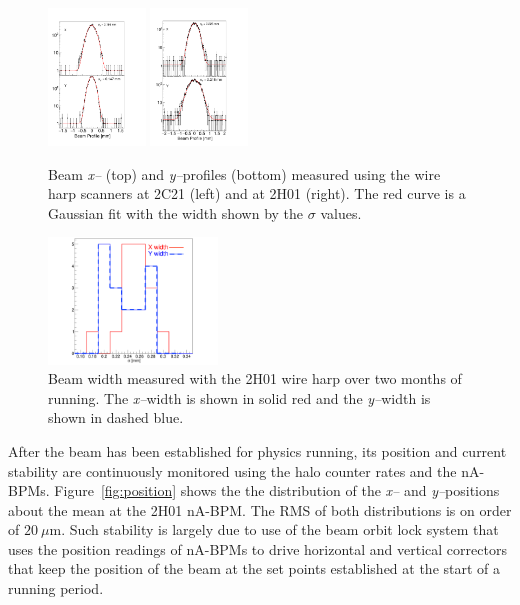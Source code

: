 \begin{figure}[ht]
\begin{center}
\includegraphics[width=0.23\textwidth]{2C21_fits.pdf}
\includegraphics[width=0.23\textwidth]{2H01_fits.pdf}
	\caption{Beam {\it x--} (top) and {\it y--}profiles (bottom) measured using the wire harp scanners at 2C21 (left) and at 2H01 (right). The red
	curve is a Gaussian fit with the width shown by the $\sigma$ values. }
\label{fig:profile}
\end{center}
\end{figure}

\begin{figure}[ht]
\begin{center}
\includegraphics[width=0.4\textwidth]{BeamWidth.pdf}
	\caption{Beam width measured with the 2H01 wire harp over two months of running. The {\it x--}width is shown in solid red and the 
	{\it y--}width is shown in dashed blue.}
\label{fig:prof2h01}
\end{center}
\end{figure}

After the beam has been established for physics running, its position and current stability are continuously monitored using the halo 
counter rates and the nA-BPMs. Figure~\ref{fig:position} shows the the distribution of the {\it x--} and {\it y--}positions about the mean at the 
2H01 nA-BPM. The RMS of both distributions is on order of $20~\mu$m. Such stability is largely due to use of the beam orbit lock system 
that uses the position readings of nA-BPMs to drive horizontal and vertical correctors that keep the position of the beam at the set points 
established at the start of a running period.


